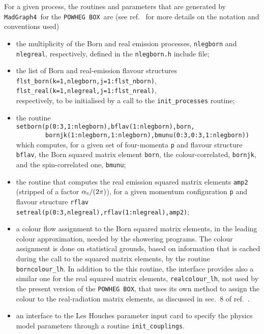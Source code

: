 \documentclass[paper]{JHEP3}
\newcommand\sss{\mathchoice%
{\displaystyle}%
{\scriptstyle}%
{\scriptscriptstyle}%
{\scriptscriptstyle}%
}
\newcommand\as{\alpha_{\sss\rm S}}
\newcommand\POWHEGBOX{{\tt POWHEG BOX}}
\newcommand\MG{{\tt MadGraph4}}
\begin{document}
For a given process, the routines and parameters that are generated by
\MG\ for the \POWHEGBOX\ are (see ref.~\cite{Alioli:2010xd} for more
details on the notation and conventions used)
\begin{itemize} 
\item the multiplicity of the Born and real emission processes,
  \verb|nlegborn| and \verb|nlegreal|, respectively, defined in the
  \verb|nlegborn.h| include file;

\item the list of Born and real-emission flavour structures\\
  \verb|flst_born(k=1,nlegborn,j=1:flst_nborn)|,   \\
  \verb|flst_real(k=1,nlegreal,j=1:flst_nreal)|,   \\
  respectively, to be initialised by a call to the \verb|init_processes|
  routine;

\item the routine\\
  \verb|setborn(p(0:3,1:nlegborn),bflav(1:nlegborn),born,|\\
  \verb|        bornjk(1:nlegborn,1:nlegborn),bmunu(0:3,0:3,1:nlegborn))|\\
   which computes, for a given set of four-momenta \verb|p| and flavour
   structure \verb|bflav|, the Born squared matrix element \verb|born|, the
   colour-correlated, \verb|bornjk|, and the spin-correlated one,
   \verb|bmunu|;

\item the routine that computes the real emission squared matrix elements
  \verb|amp2| (stripped of a factor $\as/(2\pi)$), for a given momentum
  configuration \verb|p| and flavour structure \verb|rflav|\\
  \verb|setreal(p(0:3,nlegreal),rflav(1:nlegreal),amp2)|;

\item a colour flow assignment to the Born squared matrix elements, in the
  leading colour approximation, needed by the showering programs. The colour
  assignment is done on statistical grounds, based on information that is
  cached during the call to the squared matrix elements, by the routine
  \verb|borncolour_lh|. In addition to the this routine, the interface
  provides also a similar one for the real squared matrix elements,
  \verb|realcolour_lh|, not used by the present version of the \POWHEGBOX{},
  that uses its own method to assign the colour to the real-radiation matrix
  elements, as discussed in sec.~8 of ref.~\cite{Alioli:2010xd}.

\item an interface to the Les Houches parameter input card to specify the
  physics model parameters through a routine \verb|init_couplings|.
\end{itemize}
\end{document}
